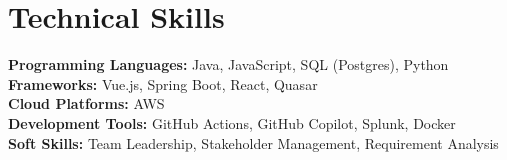 \documentclass[letterpaper,11pt]{article}
\newcommand{\resumeItem}[1]{
  \item\small{
    {#1 \vspace{-2pt}}
  }
}
\newcommand{\resumeItemListStart}{\begin{itemize}}
\newcommand{\resumeItemListEnd}{\end{itemize}\vspace{-5pt}}
\begin{document}
\section{Technical Skills}
 \begin{itemize}[leftmargin=0.15in, label={}]
    \small{\item{
     \textbf{Programming Languages: }{Java, JavaScript, SQL (Postgres), Python} \\
     \textbf{Frameworks: }{Vue.js, Spring Boot, React, Quasar}\\
     \textbf{Cloud Platforms: }{AWS} \\
     \textbf{Development Tools: }{GitHub Actions, GitHub Copilot, Splunk, Docker}\\
     \textbf{Soft Skills: }{Team Leadership, Stakeholder Management, Requirement Analysis}\\
    }}
 \end{itemize}



\end{document}
